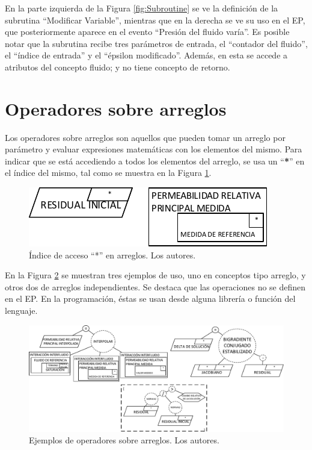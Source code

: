 En la parte izquierda de la Figura \ref{fig:Subroutine} se ve  la definición de la subrutina ``Modificar Variable'', mientras que en la derecha se ve su uso en el EP, que posteriormente aparece en el evento ``Presión del fluido varía''. Es posible notar que la subrutina recibe tres parámetros de entrada, el ``contador del fluido'', el ``índice de entrada'' y el ``épsilon modificado''. Además, en esta se accede a atributos del concepto fluido; y no tiene concepto de retorno.

\section{Operadores sobre arreglos}\label{sec:PS_Operators}
Los operadores sobre arreglos son aquellos que pueden tomar un arreglo por parámetro y evaluar expresiones matemáticas con los elementos del mismo. Para indicar que se está accediendo a todos los elementos del arreglo, se usa un ``\textbf{*}'' en el índice del mismo, tal como se muestra en la Figura \ref{fig:Access}.\\

\begin{figure}[h]
	\centering%
	\includegraphics[scale=1]{Fig/EjemploAcceso.pdf}%
	\caption[Índice de acceso ``*'' en arreglos.]{Índice de acceso ``*'' en arreglos. Los autores.} \label{fig:Access}
\end{figure}

En la Figura \ref{fig:Operators} se muestran tres ejemplos de uso, uno en conceptos tipo arreglo, y otros dos de arreglos independientes. Se destaca que las operaciones no se definen en el EP. En la programación, éstas se usan desde alguna librería o función del lenguaje.

\begin{figure}[h]
	\centering%
	\includegraphics[scale=0.6]{Fig/OperadoresArreglos.pdf}%
	\caption[Ejemplos de operadores sobre arreglos.]{Ejemplos de operadores sobre arreglos. Los autores.} \label{fig:Operators}
\end{figure}

